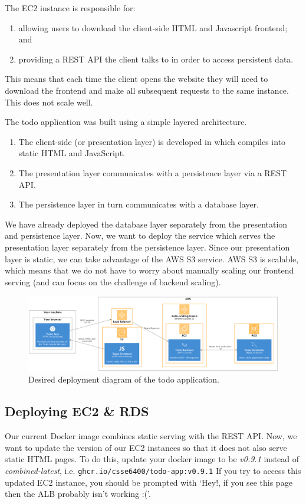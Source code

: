 \documentclass{csse4400}
\begin{document}
The EC2 instance is responsible for:
\begin{enumerate}
  \item allowing users to download the client-side HTML and Javascript frontend; and
  \item providing a REST API the client talks to in order to access persistent data.
\end{enumerate}
This means that each time the client opens the website they will need to download the frontend and make all subsequent requests to the same instance.
This does not scale well.

The todo application was built using a simple layered architecture.
\begin{enumerate}
  \item The client-side (or presentation layer) is developed in  which compiles into static HTML and JavaScript.
  \item The presentation layer communicates with a  persistence layer via a REST API.
  \item The persistence layer in turn communicates with a  database layer.
\end{enumerate}

We have already deployed the database layer separately from the presentation and persistence layer.
Now, we want to deploy the service which serves the presentation layer separately from the persistence layer.
Since our presentation layer is static,
we can take advantage of the AWS S3 service.
AWS S3 is scalable, which means that we do not have to worry about manually scaling our frontend serving (and can focus on the challenge of backend scaling).

\begin{figure}[ht]
\includegraphics[width=\textwidth]{diagrams/SimpleS3Deployment}
\caption{Desired deployment diagram of the todo application.}
\end{figure}

\subsection{Deploying EC2 \& RDS}
Our current Docker image combines static serving with the REST API.
Now, we want to update the version of our EC2 instances so that it does not also serve static HTML pages.
To do this,
update your docker image to be \textsl{v0.9.1} instead of \textsl{combined-latest},
i.e. \texttt{ghcr.io/csse6400/todo-app:v0.9.1}
If you try to access this updated EC2 instance, 
you should be prompted with `Hey!, if you see this page then the ALB probably isn't working :('.
\end{document}
